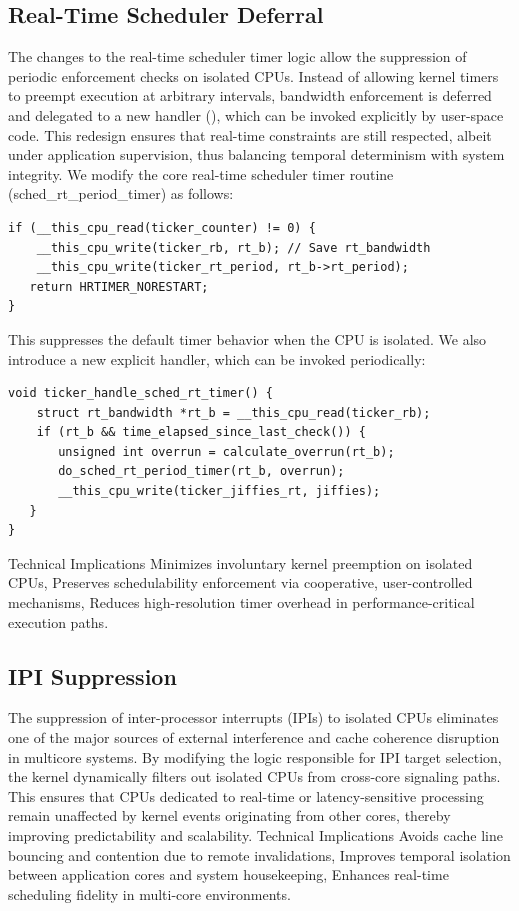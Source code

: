 \documentclass[letterpaper]{article}
\begin{document}
\subsection{Real-Time Scheduler Deferral}
The changes to the real-time scheduler timer logic allow the suppression of periodic enforcement
checks on isolated CPUs. Instead of allowing kernel timers to preempt execution at arbitrary
intervals, bandwidth enforcement is deferred and delegated to a new handler (), which can be
invoked explicitly by user-space code.
This redesign ensures that real-time constraints are still respected, albeit under application
supervision, thus balancing temporal determinism with system integrity.
We modify the core real-time scheduler timer routine (sched\_rt\_period\_timer) as follows:
\begin{verbatim}
if (__this_cpu_read(ticker_counter) != 0) {
    __this_cpu_write(ticker_rb, rt_b); // Save rt_bandwidth
    __this_cpu_write(ticker_rt_period, rt_b->rt_period);
   return HRTIMER_NORESTART;
}
\end{verbatim}
This suppresses the default timer behavior when the CPU is isolated.
We also introduce a new explicit handler, which can be invoked periodically:
\begin{verbatim}
void ticker_handle_sched_rt_timer() {
    struct rt_bandwidth *rt_b = __this_cpu_read(ticker_rb);
    if (rt_b && time_elapsed_since_last_check()) {
       unsigned int overrun = calculate_overrun(rt_b);
       do_sched_rt_period_timer(rt_b, overrun);
       __this_cpu_write(ticker_jiffies_rt, jiffies);
   }
}
\end{verbatim}
Technical Implications
Minimizes involuntary kernel preemption on isolated CPUs,
Preserves schedulability enforcement via cooperative, user-controlled mechanisms,
Reduces high-resolution timer overhead in performance-critical execution paths.

\subsection{IPI Suppression}
The suppression of inter-processor interrupts (IPIs) to isolated CPUs eliminates one of the major
sources of external interference and cache coherence disruption in multicore systems. By
modifying the logic responsible for IPI target selection, the kernel dynamically filters out isolated
CPUs from cross-core signaling paths.
This ensures that CPUs dedicated to real-time or latency-sensitive processing remain unaffected
by kernel events originating from other cores, thereby improving predictability and scalability.
Technical Implications
Avoids cache line bouncing and contention due to remote invalidations,
Improves temporal isolation between application cores and system housekeeping,
Enhances real-time scheduling fidelity in multi-core environments.
\end{document}
